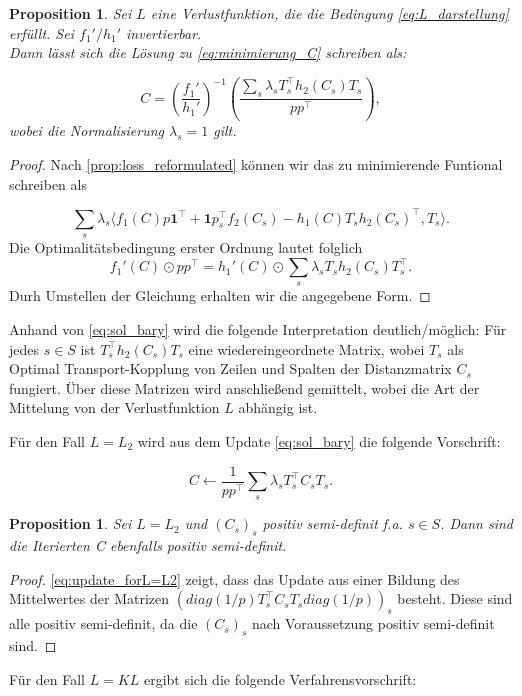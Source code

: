 \documentclass[11pt,a4paper]{article}
\newtheorem{proposition}[theorem]{Proposition}
\numberwithin{equation}{section}
\begin{document}
	
	\begin{proposition}
		Sei $L$ eine Verlustfunktion, die die Bedingung \autoref{eq:L_darstellung} erfüllt. Sei $f_1'/h_1'$ invertierbar. \\
		Dann lässt sich die Lösung zu \autoref{eq:minimierung_C} schreiben als:
		
		\begin{equation}
		C = \left(\frac{f_1'}{h_1'}\right)^{-1} \left(\frac{\sum_s{\lambda_s T_s^\top h_2(C_s)T_s}}{pp^\top}\right),
		\label{eq:sol_bary}
		\end{equation}
		wobei die Normalisierung $\lambda_s = 1$ gilt.
	\end{proposition}
	\begin{proof}
		Nach \autoref{prop:loss_reformulated} können wir das zu minimierende Funtional schreiben als
		
		\begin{equation}
		\sum_s{\lambda_s \langle f_1(C)p\boldsymbol{1}^\top + \boldsymbol{1}p_s^\top f_2(C_s) - h_1(C)T_s h_2(C_s)^\top , T_s \rangle}.
		\end{equation}
		Die Optimalitätsbedingung erster Ordnung lautet folglich 
		\begin{equation}
		f_1'(C) \odot pp^\top = h_1'(C) \odot \sum_s{\lambda_s T_sh_2(C_s)T_s^\top}.
		\end{equation}
		Durh Umstellen der Gleichung erhalten wir die angegebene Form.
	\end{proof}
	Anhand von \autoref{eq:sol_bary} wird die folgende Interpretation deutlich/möglich: Für jedes $s \in S$ ist $T_s^\top h_2(C_s)T_s$ eine wiedereingeordnete Matrix, wobei $T_s$ als Optimal Transport-Kopplung von Zeilen und Spalten der Distanzmatrix $C_s$ fungiert. Über diese Matrizen wird anschließend gemittelt, wobei die Art der Mittelung von der Verlustfunktion $L$ abhängig ist.
	
	Für den Fall $L=L_2$ wird aus dem Update \autoref{eq:sol_bary} die folgende Vorschrift:
	
	\begin{equation}
	C \leftarrow \frac{1}{pp^\top}\sum_s{\lambda_s T_s^\top C_s T_s}. \label{eq:update_forL=L2}
	\end{equation}
	
	\begin{proposition}
		Sei $L=L_2$ und $(C_s)_s$ positiv semi-definit f.a. $s \in S$. Dann sind die Iterierten C ebenfalls positiv semi-definit. 
	\end{proposition}
	\begin{proof}
		\autoref{eq:update_forL=L2} zeigt, dass das Update aus einer Bildung des Mittelwertes der Matrizen $(diag(1/p)T_s^\top C_s T_s diag(1/p))_s$ besteht. Diese sind alle positiv semi-definit, da die $(C_s)_s$ nach Voraussetzung positiv semi-definit sind.
	\end{proof}
	Für den Fall $L = KL$ ergibt sich die folgende Verfahrensvorschrift:
	
\end{document}
